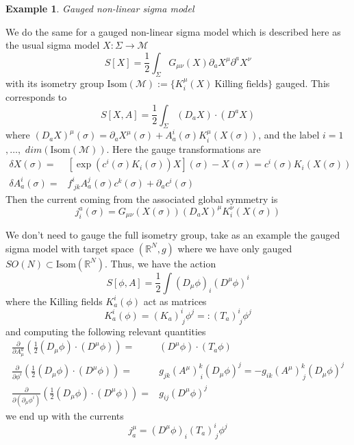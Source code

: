 \documentclass[a4paper,12pt]{article}
\newtheorem{exm}{Example}
\numberwithin{equation}{section}
\numberwithin{thm}{section}
\numberwithin{exm}{section}
\newcommand{\M}{\mathcal M}
\newcommand{\p}{\partial}
\newcommand{\R}{{\mathbb R}}
\newcommand{\<}{{\langle}}
\renewcommand{\>}{{\rangle}}
\renewcommand{\d}{{\delta}}
\newcommand{\m}{{\mu}}
\newcommand{\n}{{\nu}}
\newcommand{\s}{{\sigma}}
\renewcommand{\S}{{\Sigma}}
\begin{document}
\begin{exm} Gauged non-linear sigma model \end{exm}
We do the same for a gauged non-linear sigma model which is described here as the usual sigma model $X:\S\rightarrow \M$
	\begin{equation}
	S[X] = \frac{1}{2} \int_\S G_{\m\n}(X) \p_a X^\m \p^a X^\n
	\end{equation}
with its isometry group $\text{Isom}(\M):=\{ K^\m_i(X)\ \text{Killing fields}\}$ gauged. This corresponds to
	\begin{equation}
	S[X,A]=\frac{1}{2}\int_\S (D_a X)\cdot (D^a X)
	\end{equation}
where $(D_a X)^\m(\s)=\p_a X^\m(\s)+A^i_a(\s)K^\m_i(X(\s))$, and the label $i=1$ $,\ldots,$ $dim(\text{Isom}(\M))$. Here the gauge transformations are
	\begin{align}
	\d X(\s) = & \left[ \exp\left(c^i(\s) K_i(\s)\right)X \right](\s) - X(\s) = c^i(\s) K_i(X(\s)) \\
	\d A_a^i(\s) = & f^i_{\ jk}A^j_a(\s) c^k(\s)+ \p_a c^i(\s)
	\end{align}
Then the current coming from the associated global symmetry is
	\begin{equation}
	j^a_i(\sigma)=G_{\mu\nu}(X(\sigma))(D_a X)^\mu K^\nu_i(X(\sigma))
	\end{equation}

We don't need to gauge the full isometry group, take as an example the gauged sigma model with target space $(\R^N, g)$ where we have only gauged $SO(N)\subset \text{Isom}(\R^N)$. Thus, we have the action
	\begin{equation}
	S[\phi, A]=\frac{1}{2}\int (D_\mu \phi)_i (D^\mu\phi)^i
	\end{equation}
where the Killing fields $K^i_a(\phi)$ act as matrices
	\begin{equation}
	K^i_a(\phi) = (K_a)^i_{\ j}\phi^j =: (T_a)^i_{\ j}\phi^j
	\end{equation}
and computing the following relevant quantities
	\begin{align}
	\frac{\p}{\p A^a_\mu}\left(\frac{1}{2}(D_\mu\phi)\cdot(D^\mu\phi)\right)=&(D^\mu\phi)\cdot(T_a\phi)\\
	\frac{\p}{\p\phi^i}\left(\frac{1}{2}(D_\mu\phi)\cdot(D^\mu\phi)\right)=&g_{jk}(A^\mu)^k_{\ i}(D_\mu\phi)^j=-g_{ik}(A^\mu)^k_{\ j}(D_\mu\phi)^j\\
	\frac{\p}{\p(\p_\mu\phi^i)}\left(\frac{1}{2}(D_\mu\phi)\cdot(D^\mu\phi)\right)=&g_{ij}(D^\mu\phi)^j
	\end{align}
we end up with the currents
	\begin{equation}
	j^\m_a = (D^\m\phi)_i (T_a)^i_{\ j}\phi^j
	\end{equation}	 
\end{document}

